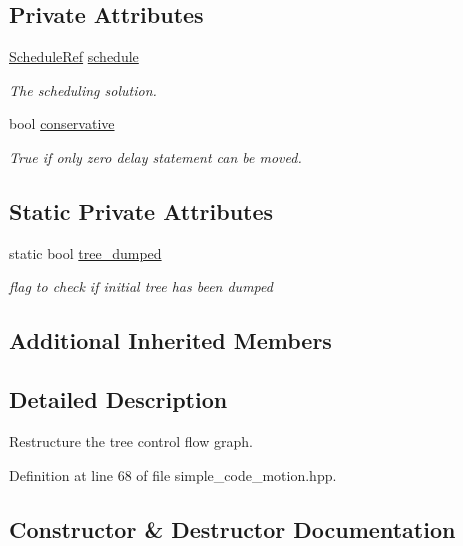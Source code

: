 \subsection*{Private Attributes}
\begin{DoxyCompactItemize}
\item 
\hyperlink{schedule_8hpp_af67f402958b3b52a1ec5cc4ce08ae3b9}{Schedule\+Ref} \hyperlink{classsimple__code__motion_aa7519142b3b0fe26b2da83a0b5a4bdae}{schedule}
\begin{DoxyCompactList}\small\item\em The scheduling solution. \end{DoxyCompactList}\item 
bool \hyperlink{classsimple__code__motion_a0bf7b69fea8137b06ee659620aaad238}{conservative}
\begin{DoxyCompactList}\small\item\em True if only zero delay statement can be moved. \end{DoxyCompactList}\end{DoxyCompactItemize}
\subsection*{Static Private Attributes}
\begin{DoxyCompactItemize}
\item 
static bool \hyperlink{classsimple__code__motion_a592659ec32a51bfc395647f04ae2b027}{tree\+\_\+dumped}
\begin{DoxyCompactList}\small\item\em flag to check if initial tree has been dumped \end{DoxyCompactList}\end{DoxyCompactItemize}
\subsection*{Additional Inherited Members}


\subsection{Detailed Description}
Restructure the tree control flow graph. 

Definition at line 68 of file simple\+\_\+code\+\_\+motion.\+hpp.



\subsection{Constructor \& Destructor Documentation}
\mbox{\label{classsimple__code__motion_ad187a9fcaf94b18b0fa72c8725386d4b}} 
